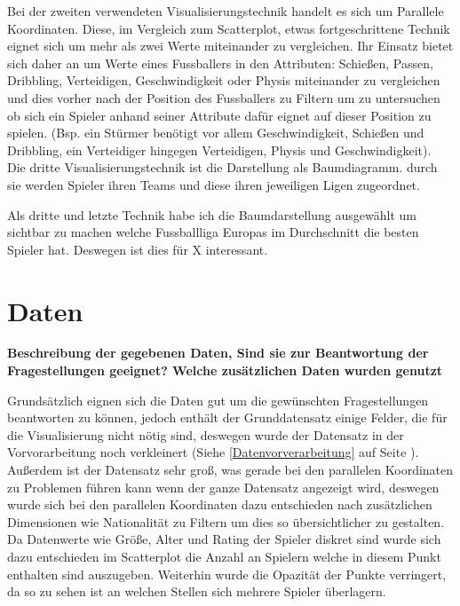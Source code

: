 \documentclass[usegeometry=true]{scrartcl}
\begin{document}
Bei der zweiten verwendeten Visualisierungstechnik handelt es sich um Parallele Koordinaten. Diese, im Vergleich zum Scatterplot, etwas fortgeschrittene Technik eignet sich um mehr als zwei Werte miteinander zu vergleichen. Ihr Einsatz bietet sich daher an um Werte eines Fussballers in den Attributen: Schießen, Passen, Dribbling, Verteidigen, Geschwindigkeit oder Physis miteinander zu vergleichen und dies vorher nach der Position des Fussballers zu Filtern um zu untersuchen ob sich ein Spieler anhand seiner Attribute dafür eignet auf dieser Position zu spielen. (Bsp. ein Stürmer benötigt vor allem Geschwindigkeit, Schießen und Dribbling, ein Verteidiger hingegen Verteidigen, Physis und Geschwindigkeit).\\

Die dritte Visualisierungstechnik ist die Darstellung als Baumdiagramm. durch sie werden Spieler ihren Teams und diese ihren jeweiligen Ligen zugeordnet.



Als dritte und letzte Technik habe ich die Baumdarstellung ausgewählt um sichtbar zu machen welche Fussballliga Europas im Durchschnitt die besten Spieler hat. Deswegen ist dies für X interessant.\\

\section{Daten}

\textbf{Beschreibung der gegebenen Daten, Sind sie zur Beantwortung der Fragestellungen geeignet? Welche zusätzlichen Daten wurden genutzt} 

Grundsätzlich eignen sich die Daten gut um die gewünschten Fragestellungen beantworten zu können, jedoch enthält der Grunddatensatz einige Felder, die für die Visualisierung nicht nötig sind, deswegen wurde der Datensatz in der Vorvorarbeitung noch verkleinert (Siehe \ref{Datenvorverarbeitung} auf Seite \pageref{Datenvorverarbeitung}). Außerdem ist der Datensatz sehr groß, was gerade bei den parallelen Koordinaten zu Problemen führen kann wenn der ganze Datensatz angezeigt wird, deswegen wurde sich bei den parallelen Koordinaten dazu entschieden nach zusätzlichen Dimensionen wie Nationalität zu Filtern um dies so übersichtlicher zu gestalten. Da Datenwerte wie Größe, Alter und Rating der Spieler diskret sind wurde sich dazu entschieden im Scatterplot die Anzahl an Spielern welche in diesem Punkt enthalten sind auszugeben. Weiterhin wurde die Opazität der Punkte verringert, da so zu sehen ist an welchen Stellen sich mehrere Spieler überlagern. 
\end{document}
